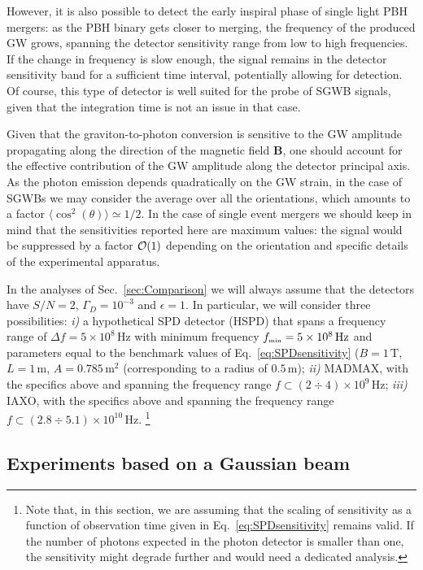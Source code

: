 \documentclass[11pt,a4paper]{article}
\begin{document}
However, it is also possible to detect the early inspiral phase of single light PBH mergers: 
as the PBH binary gets closer to merging, the frequency of the produced GW grows, spanning the detector sensitivity range from low to high frequencies. 
If the change in frequency is slow enough, the signal remains in the detector sensitivity band for a sufficient time interval, potentially allowing for detection. 
Of course, this type of detector is well suited for the probe of SGWB signals, given that the integration time is not an issue in that case. 

Given that the graviton-to-photon conversion is sensitive to the GW amplitude propagating along the direction of the magnetic field $\mathbf{B}$, one should account 
for the effective contribution of the GW amplitude along the 
detector principal axis. 
As the photon emission depends quadratically on the GW strain, in the case of SGWBs we may consider the average over all the orientations, which amounts to a factor $\langle \cos^2(\theta)  \rangle \simeq 1/2$. 
In the case of single event mergers we should keep in mind that the sensitivities reported here are maximum values: the signal would be suppressed by a factor ${\cal O}(1)$ depending on the orientation and specific details of the experimental apparatus.

In the analyses of Sec.~\ref{sec:Comparison} we will always assume that the detectors have $S/N = 2$, $\Gamma_D = 10^{-3}$ and $\epsilon = 1$. In particular, we will consider three possibilities: \textit{i)} a hypothetical SPD detector (HSPD) that spans a frequency range of $\Delta f = 5 \times 10^8 \, \text{Hz}$ with minimum frequency $f_\text{\tiny min} = 5 \times 10^8 \, \text{Hz}$ and parameters equal to the benchmark values of Eq.~\eqref{eq:SPDsensitivity} ($B = 1 \, \text{T}$, $L = 1 \, \text{m}$, $A = 0.785 \, \text{m}^2$ (corresponding to a radius of $0.5 \, \text{m}$); \textit{ii)} MADMAX, with the specifics above and spanning the frequency range $f \subset(2 \div 4) \times 10^9 \, \text{Hz}$; \textit{iii)} IAXO, with the specifics above and spanning the frequency range $f \subset(2.8 \div 5.1) \times 10^{10} \, \text{Hz}$.
\footnote{Note that, in this section, we are assuming that the scaling of sensitivity as a function of observation time given in Eq.~\eqref{eq:SPDsensitivity} remains valid.
If the number of photons expected in the photon detector is smaller than one, the sensitivity might degrade further and would need a dedicated analysis.}

\subsection{Experiments based on a Gaussian beam}
\label{sec:GB}
\end{document}
